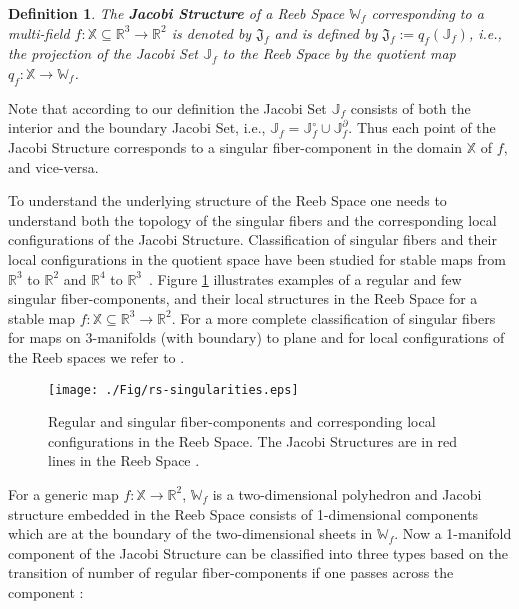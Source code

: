 \documentclass[twocolumn]{article}
\newcommand{\X}{\mathbb{X}}
\newcommand{\R}{\mathbb{R}}
\newcommand{\Int}[1]{{#1}^{\circ}}
\newcommand{\Bd}[1]{{#1}^{\partial}}
\newcommand{\RS}{\mathbb{W}_f}
\newcommand{\JS}{\mathfrak{J}_f}
\newcommand{\Ji}{\Int{\mathbb{J}}_f}
\newcommand{\Jb}{\Bd{\mathbb{J}}_f}
\newcommand{\Jf}{\mathbb{J}_f}
\newtheorem{dfn}{Definition}[section]
\begin{document}
\begin{dfn}
The \textbf{Jacobi Structure} of a Reeb Space $\RS$ corresponding to a
multi-field $f:\mathbb{X}\subseteq \mathbb{R}^3\rightarrow \mathbb{R}^2$ is denoted
by $\JS$ and is defined by $\JS:=q_f(\Jf)$, i.e., the projection of the Jacobi Set
$\Jf$ to the Reeb Space by the quotient map $q_f:\mathbb{X}\rightarrow\RS$.
\end{dfn}

\noindent
Note that according to our definition the Jacobi Set $\Jf$ consists of both the interior and the
boundary Jacobi Set, i.e., $\Jf=\Ji\cup \Jb$.
Thus each point of the Jacobi Structure corresponds to a singular fiber-component
in the domain $\X$ of $f$, and vice-versa. 


To understand the underlying structure of the Reeb Space
one needs to understand both the topology of the singular fibers 
and the corresponding local configurations of the Jacobi Structure. Classification of singular
fibers and their local configurations in the quotient space have been studied
for stable maps from $\mathbb{R}^3$ to $\R^2$ and $\R^4$ to $\R^3$~\cite{2004-Saeki}.
Figure \ref{fig:jacobi} illustrates examples of a regular and few
singular fiber-components, and their local structures in the Reeb Space
\cite{Kushner-1984, Levine1985} for a stable map $f:\mathbb{X}\subseteq
\mathbb{R}^3\rightarrow \mathbb{R}^2$.
For a more complete classification of singular fibers for maps on 
3-manifolds (with boundary) to plane and for local configurations of the Reeb spaces we refer to \cite{Saeki2015, SaekiCobordism2015}.
\begin{figure}[t!]
\begin{center}
\texttt{[image: ./Fig/rs-singularities.eps]}
\end{center}
\caption{Regular and singular fiber-components and corresponding local configurations in
  the Reeb Space. The Jacobi Structures are in red lines in the Reeb
  Space \cite{Saeki2015}.}
\label{fig:jacobi}
\end{figure} 

For a generic map $f:\X\rightarrow\R^2$, $\RS$ is a two-dimensional
polyhedron and Jacobi structure embedded in the Reeb Space consists of
1-dimensional components which are at the boundary of the
two-dimensional sheets in $\RS$.
Now a 1-manifold component of the Jacobi Structure can be classified into three types
based on  the transition of number of regular fiber-components if one
passes across the component \cite{Saeki2014}:
\end{document}
